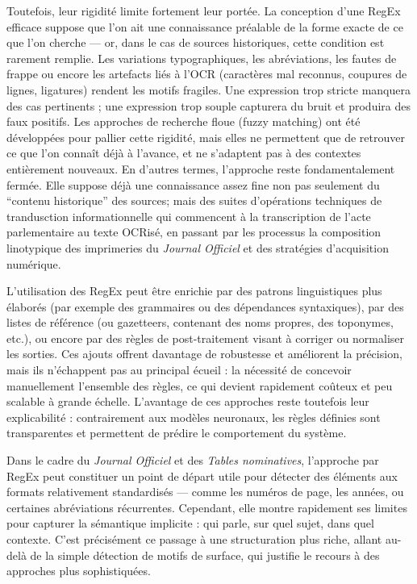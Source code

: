 Toutefois, leur rigidité limite fortement leur portée. La conception d’une RegEx efficace suppose que l’on ait une connaissance préalable de la forme exacte de ce que l’on cherche — or, dans le cas de sources historiques, cette condition est rarement remplie. Les variations typographiques, les abréviations, les fautes de frappe ou encore les artefacts liés à l’OCR (caractères mal reconnus, coupures de lignes, ligatures) rendent les motifs fragiles. Une expression trop stricte manquera des cas pertinents ; une expression trop souple capturera du bruit et produira des faux positifs. Les approches de recherche floue (fuzzy matching) ont été développées pour pallier cette rigidité, mais elles ne permettent que de retrouver ce que l’on connaît déjà à l’avance, et ne s’adaptent pas à des contextes entièrement nouveaux. En d’autres termes, l’approche reste fondamentalement fermée. Elle suppose déjà une connaissance assez fine non pas seulement du \enquote{contenu historique} des sources; mais des suites d'opérations techniques de trandusction informationnelle qui commencent à la transcription de l'acte parlementaire au texte OCRisé, en passant par les processus la composition linotypique des imprimeries du \emph{Journal Officiel} et des stratégies d'acquisition numérique.

L’utilisation des RegEx peut être enrichie par des patrons linguistiques plus élaborés (par exemple des grammaires ou des dépendances syntaxiques), par des listes de référence (ou gazetteers, contenant des noms propres, des toponymes, etc.), ou encore par des règles de post-traitement visant à corriger ou normaliser les sorties. Ces ajouts offrent davantage de robustesse et améliorent la précision, mais ils n’échappent pas au principal écueil : la nécessité de concevoir manuellement l’ensemble des règles, ce qui devient rapidement coûteux et peu scalable à grande échelle. L’avantage de ces approches reste toutefois leur explicabilité : contrairement aux modèles neuronaux, les règles définies sont transparentes et permettent de prédire le comportement du système.

Dans le cadre du \emph{Journal Officiel} et des \emph{Tables nominatives}, l’approche par RegEx peut constituer un point de départ utile pour détecter des éléments aux formats relativement standardisés — comme les numéros de page, les années, ou certaines abréviations récurrentes. Cependant, elle montre rapidement ses limites pour capturer la sémantique implicite : qui parle, sur quel sujet, dans quel contexte. C’est précisément ce passage à une structuration plus riche, allant au-delà de la simple détection de motifs de surface, qui justifie le recours à des approches plus sophistiquées. 

